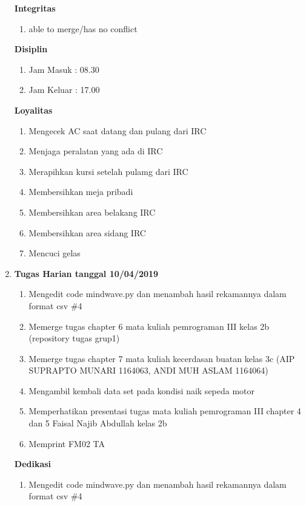 \begin{enumerate}
\textbf{Integritas}
\begin{enumerate}
\item able to merge/has no conflict
\end{enumerate}

\textbf{Disiplin}
\begin{enumerate}
\item Jam Masuk : 08.30
\item Jam Keluar : 17.00
\end{enumerate}

\textbf{Loyalitas}
\begin{enumerate}
\item Mengecek AC saat datang dan pulang dari IRC
\item Menjaga peralatan yang ada di IRC
\item Merapihkan kursi setelah pulamg dari IRC
\item Membersihkan meja pribadi
\item Membersihkan area belakang IRC
\item Membersihkan area sidang IRC
\item Mencuci gelas
\end{enumerate}

\item \textbf{Tugas Harian tanggal 10/04/2019}
\begin{enumerate}
\item Mengedit code mindwave.py dan menambah hasil rekamannya dalam format csv \#4
\item Memerge tugas chapter 6 mata kuliah pemrograman III kelas 2b (repository tugas grup1)
\item Memerge tugas chapter 7 mata kuliah kecerdasan buatan kelas 3c  (AIP SUPRAPTO MUNARI 1164063, ANDI MUH ASLAM 1164064)
\item Mengambil kembali data set pada kondisi naik sepeda motor
\item Memperhatikan presentasi tugas mata kuliah pemrograman III chapter 4 dan 5 Faisal Najib Abdullah kelas 2b
\item Memprint FM02 TA
\end{enumerate}

\textbf{Dedikasi}
\begin{enumerate}
\item Mengedit code mindwave.py dan menambah hasil rekamannya dalam format csv \#4
\end{enumerate}


\end{enumerate}
